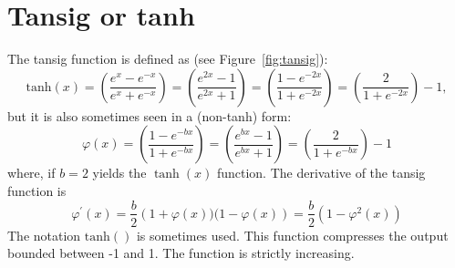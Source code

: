 \section{Tansig or tanh}

The tansig function is defined as (see Figure~\ref{fig:tansig}):
\begin{equation}
\textrm{tanh}(x)
=\left(\frac{e^{x}-e^{-x}}{e^{x}+e^{-x}}\right)
=\left(\frac{e^{2x}-1}{e^{2x}+1}\right)
=\left(\frac{1-e^{-2x}}{1+e^{-2x}}\right)
=\left(\frac{2}{1+e^{-2x}}\right)-1,
\end{equation}  
but it is also sometimes seen in a (non-tanh) form:
\begin{equation}
\varphi(x)
=\left(\frac{1-e^{-bx}}{1+e^{-bx}}\right)
=\left(\frac{e^{bx}-1}{e^{bx}+1}\right)
=\left(\frac{2}{1+e^{-bx}}\right)-1
\end{equation}  
where, if $b=2$ yields the $\tanh(x)$ function.
The derivative of the tansig function is 
\begin{equation}
 \varphi^\prime(x)
 = \frac{b}{2} \left(1+\varphi(x))(1-\varphi(x)\right)
 = \frac{b}{2}\left(1-\varphi^2(x)\right)
\end{equation}
The notation $\textrm{tanh}()$ is sometimes used.
This function compresses the output bounded between -1 and 1. The function is strictly increasing. 



